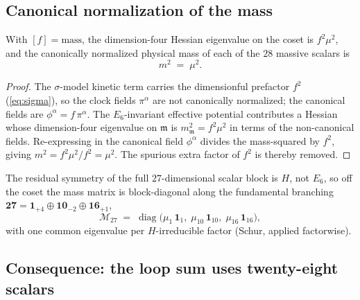 \subsection{Canonical normalization of the mass}
\label{sec:masses:canonical}

\begin{theorem}\label{thm:masses:canonical}
\label{thm:MassSpectrum}
\label{thm:gravity:mass}
With $[f]=\text{mass}$, the dimension-four Hessian eigenvalue on the coset is
$f^{2}\mu^{2}$, and the canonically normalized physical mass of each of the
$28$ massive scalars is
\begin{equation}\label{eq:masses:m2}
  m^{2} \;=\; \mu^{2}.
\end{equation}
\end{theorem}

\begin{proof}
The $\sigma$-model kinetic term carries the dimensionful prefactor $f^{2}$
(\autoref{eq:sigma}), so the clock fields $\pi^{\alpha}$ are not canonically
normalized; the canonical fields are $\phi^{\alpha}=f\,\pi^{\alpha}$. The
$E_{6}$-invariant effective potential contributes a Hessian whose dimension-four
eigenvalue on $\mathfrak m$ is $m_{\mathfrak m}^{2}=f^{2}\mu^{2}$ in terms of
the non-canonical fields. Re-expressing in the canonical field $\phi^{\alpha}$
divides the mass-squared by $f^{2}$, giving $m^{2}=f^{2}\mu^{2}/f^{2}=\mu^{2}$.
The spurious extra factor of $f^{2}$ is thereby removed.
\end{proof}

The residual symmetry of the full $27$-dimensional scalar block is $H$, not
$E_{6}$, so off the coset the mass matrix is block-diagonal along the
fundamental branching
$\mathbf{27}=\mathbf 1_{+4}\oplus\mathbf{10}_{-2}\oplus\mathbf{16}_{+1}$,
\begin{equation}\label{eq:masses:27block}
  \mathcal{M}_{27}
  \;=\;
  \operatorname{diag}\!\bigl(\mu_{1}\,\mathbf 1_{1},\;
  \mu_{10}\,\mathbf 1_{10},\;\mu_{16}\,\mathbf 1_{16}\bigr),
\end{equation}
with one common eigenvalue per $H$-irreducible factor (Schur, applied factorwise).

\subsection{Consequence: the loop sum uses twenty-eight scalars}
\label{sec:masses:loopsum}

